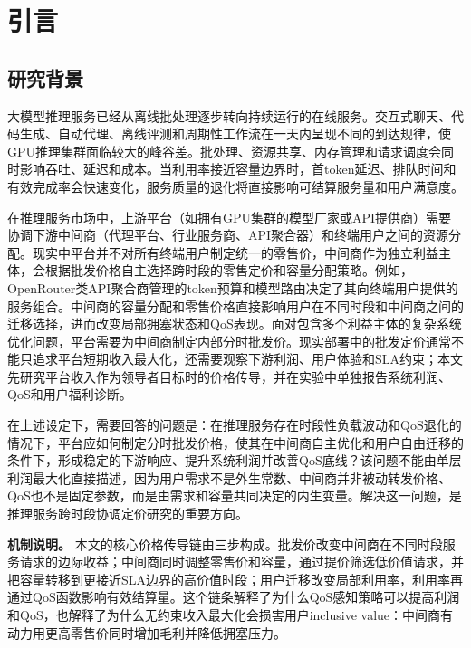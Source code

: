 \documentclass[UTF8,11pt]{ctexart}
\begin{document}
\section{引言}

\subsection{研究背景}

大模型推理服务已经从离线批处理逐步转向持续运行的在线服务。交互式聊天、代码生成、自动代理、离线评测和周期性工作流在一天内呈现不同的到达规律，使GPU推理集群面临较大的峰谷差。批处理、资源共享、内存管理和请求调度会同时影响吞吐、延迟和成本\cite{crankshaw2017clipper,gujarati2020clockwork,romero2021infaas,yu2022orca,kwon2023pagedattention,agrawal2024sarathiserve}。当利用率接近容量边界时，首token延迟、排队时间和有效完成率会快速变化，服务质量的退化将直接影响可结算服务量和用户满意度。

在推理服务市场中，上游平台（如拥有GPU集群的模型厂家或API提供商）需要协调下游中间商（代理平台、行业服务商、API聚合器）和终端用户之间的资源分配。现实中平台并不对所有终端用户制定统一的零售价，中间商作为独立利益主体，会根据批发价格自主选择跨时段的零售定价和容量分配策略。例如，OpenRouter类API聚合商管理的token预算和模型路由决定了其向终端用户提供的服务组合。中间商的容量分配和零售价格直接影响用户在不同时段和中间商之间的迁移选择，进而改变局部拥塞状态和QoS表现。面对包含多个利益主体的复杂系统优化问题，平台需要为中间商制定内部分时批发价。现实部署中的批发定价通常不能只追求平台短期收入最大化，还需要观察下游利润、用户体验和SLA约束；本文先研究平台收入作为领导者目标时的价格传导，并在实验中单独报告系统利润、QoS和用户福利诊断。

在上述设定下，需要回答的问题是：在推理服务存在时段性负载波动和QoS退化的情况下，平台应如何制定分时批发价格，使其在中间商自主优化和用户自由迁移的条件下，形成稳定的下游响应、提升系统利润并改善QoS底线？该问题不能由单层利润最大化直接描述，因为用户需求不是外生常数、中间商并非被动转发价格、QoS也不是固定参数，而是由需求和容量共同决定的内生变量。解决这一问题，是推理服务跨时段协调定价研究的重要方向。

\textbf{机制说明。} 本文的核心价格传导链由三步构成。批发价改变中间商在不同时段服务请求的边际收益；中间商同时调整零售价和容量，通过提价筛选低价值请求，并把容量转移到更接近SLA边界的高价值时段；用户迁移改变局部利用率，利用率再通过QoS函数影响有效结算量。这个链条解释了为什么QoS感知策略可以提高利润和QoS，也解释了为什么无约束收入最大化会损害用户inclusive value：中间商有动力用更高零售价同时增加毛利并降低拥塞压力。
\end{document}
